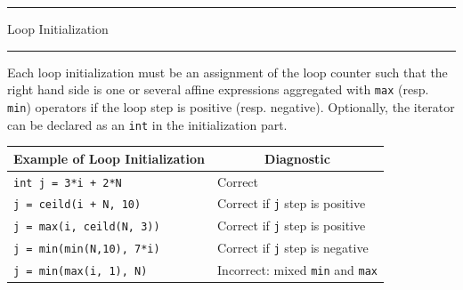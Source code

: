 \documentclass[landscape,a4paper]{article}
\def\titre#1{\begin{center}\hrule\vspace{0.1cm}#1
\vspace{0.07cm}\hrule\end{center}}
\begin{document}
\begin{multicols}{3}
\begin{center}
\end{center}


\titre{Loop Initialization}

\begin{small}
Each loop initialization must be an assignment of the loop counter such that the
right hand side is one or several affine expressions aggregated with {\tt max}
(resp. {\tt min}) operators if the loop step is positive (resp. negative).
Optionally, the iterator can be declared as an {\tt int} in the initialization part.

\vspace{0.3cm}
\begin{tabular}{p{4cm}|p{4.39cm}}
\multicolumn{1}{c|}{Example of Loop Initialization} &\multicolumn{1}{c}{Diagnostic}\\
\hline
{\tt int j = 3*i + 2*N} & Correct\\
\hline
{\tt j = ceild(i + N, 10)} & Correct if {\tt j} step is positive\\
\hline
{\tt j = max(i, ceild(N, 3))} & Correct if {\tt j} step is positive\\
\hline
{\tt j = min(min(N,10), 7*i)} & Correct if {\tt j} step is negative\\
\hline
\hline
{\tt j = min(max(i, 1), N)} & Incorrect: mixed {\tt min} and {\tt max}
\end{tabular}


\end{small}
\end{multicols}
\end{document}
